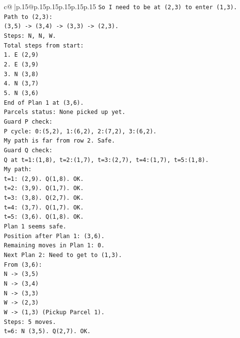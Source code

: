 \documentclass{article}
\begin{document}
{\begin{supertabular}{c@{$\;$}|p{.15\linewidth}@{}p{.15\linewidth}p{.15\linewidth}p{.15\linewidth}p{.15\linewidth}p{.15\linewidth}}
{{{\texttt{So I need to be at (2,3) to enter (1,3).} \\
\texttt{Path to (2,3):} \\
\texttt{(3,5) {-}> (3,4) {-}> (3,3) {-}> (2,3).} \\
\texttt{Steps: N, N, W.} \\
\texttt{Total steps from start:} \\
\texttt{1. E (2,9)} \\
\texttt{2. E (3,9)} \\
\texttt{3. N (3,8)} \\
\texttt{4. N (3,7)} \\
\texttt{5. N (3,6)} \\
\texttt{End of Plan 1 at (3,6).} \\
\texttt{Parcels status: None picked up yet.} \\
\texttt{Guard P check:} \\
\texttt{P cycle: 0:(5,2), 1:(6,2), 2:(7,2), 3:(6,2).} \\
\texttt{My path is far from row 2. Safe.} \\
\texttt{Guard Q check:} \\
\texttt{Q at t=1:(1,8), t=2:(1,7), t=3:(2,7), t=4:(1,7), t=5:(1,8).} \\
\texttt{My path:} \\
\texttt{t=1: (2,9). Q(1,8). OK.} \\
\texttt{t=2: (3,9). Q(1,7). OK.} \\
\texttt{t=3: (3,8). Q(2,7). OK.} \\
\texttt{t=4: (3,7). Q(1,7). OK.} \\
\texttt{t=5: (3,6). Q(1,8). OK.} \\
\texttt{Plan 1 seems safe.} \\
\texttt{Position after Plan 1: (3,6).} \\
\texttt{Remaining moves in Plan 1: 0.} \\
\texttt{Next Plan 2: Need to get to (1,3).} \\
\texttt{From (3,6):} \\
\texttt{N {-}> (3,5)} \\
\texttt{N {-}> (3,4)} \\
\texttt{N {-}> (3,3)} \\
\texttt{W {-}> (2,3)} \\
\texttt{W {-}> (1,3) (Pickup Parcel 1).} \\
\texttt{Steps: 5 moves.} \\
\texttt{t=6: N (3,5). Q(2,7). OK.} \\
}}}
\end{supertabular}}
\end{document}
